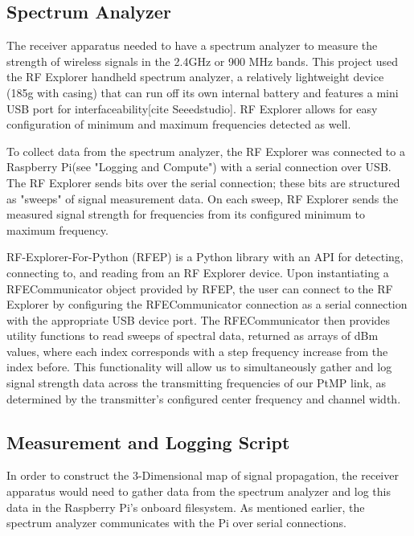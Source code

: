 \documentclass[pageno]{jpaper}
\begin{document}
\subsection{Spectrum Analyzer}
The receiver apparatus needed to have a spectrum analyzer to measure the strength of wireless signals in the 2.4GHz or 900 MHz bands. This project used the RF Explorer handheld spectrum analyzer, a relatively lightweight device (185g with casing) that can run off its own internal battery and features a mini USB port for interfaceability[cite Seeedstudio]. RF Explorer allows for easy configuration of minimum and maximum frequencies detected as well.

To collect data from the spectrum analyzer, the RF Explorer was connected to a Raspberry Pi(see "Logging and Compute") with a serial connection over USB. The RF Explorer sends bits over the serial connection; these bits are structured as "sweeps" of signal measurement data.  On each sweep, RF Explorer sends the measured signal strength for frequencies from its configured minimum to maximum frequency. 

RF-Explorer-For-Python (RFEP) is a Python library with an API for detecting, connecting to, and reading from an RF Explorer device. Upon instantiating a RFECommunicator object provided by RFEP, the user can connect to the RF Explorer by configuring the RFECommunicator connection as a serial connection with the appropriate USB device port. The RFECommunicator then provides utility functions to read sweeps of spectral data, returned as arrays of dBm values, where each index corresponds with a step frequency increase from the index before. This functionality will allow us to simultaneously gather and log signal strength data across the transmitting frequencies of our PtMP link, as determined by the transmitter's configured center frequency and channel width.

\subsection{Measurement and Logging Script}

In order to construct the 3-Dimensional map of signal propagation, the receiver apparatus would need to gather data from the spectrum analyzer and log this data in the Raspberry Pi's onboard filesystem. As mentioned earlier, the spectrum analyzer communicates with the Pi over serial connections.
\end{document}
